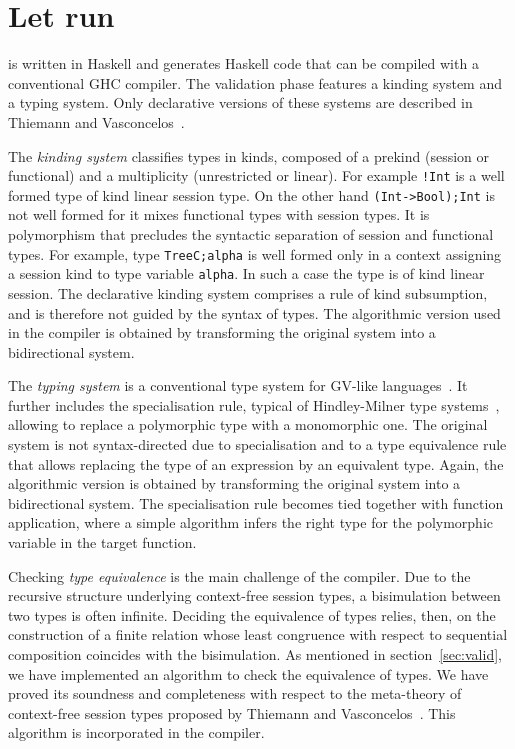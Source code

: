 \section{Let \freest{} run}
\label{sec:compiler}

\freest{} is written in Haskell and generates Haskell code that can be
compiled with a conventional GHC compiler.
%
The validation phase features a kinding system and a typing
system. Only declarative versions of these systems are described in
Thiemann and Vasconcelos~\cite{DBLP:conf/icfp/ThiemannV16}.

The \emph{kinding system} classifies types in kinds, composed of a
prekind (session or functional) and a multiplicity (unrestricted or
linear). For example \lstinline|!Int| is a well formed type of kind
linear session type. On the other hand \lstinline|(Int->Bool);Int| is
not well formed for it mixes functional types with session types.
%
It is polymorphism that precludes the syntactic separation of session
and functional types. For example, type \lstinline|TreeC;alpha| is
well formed only in a context assigning a session kind to type
variable \lstinline|alpha|. In such a case the type is of kind linear
session.
%
The declarative kinding system comprises a rule of kind subsumption,
and is therefore not guided by the syntax of types. The algorithmic
version used in the compiler is obtained by transforming the original
system into a bidirectional system.

The \emph{typing system} is a conventional type system for GV-like
languages~\cite{DBLP:journals/jfp/GayV10}. It further includes the
specialisation rule, typical of Hindley-Milner type
systems~\cite{DBLP:journals/jcss/Milner78}, allowing to replace a
polymorphic type with a monomorphic one. The original system is not
syntax-directed due to specialisation and to a type equivalence rule
that allows replacing the type of an expression by an equivalent
type.
%
Again, the algorithmic version is obtained by transforming the
original system into a bidirectional system. The specialisation rule
becomes tied together with function application, where a simple
algorithm infers the right type for the polymorphic variable in the
target function.

Checking \emph{type equivalence} is the main challenge of the
compiler. Due to the recursive structure underlying context-free 
session types, a bisimulation between two types is often infinite. 
Deciding the equivalence of types relies, then, on the construction 
of a finite relation whose least congruence with respect to  
sequential composition coincides with the bisimulation. As mentioned
in section~\ref{sec:valid}, we have implemented an algorithm 
to check the equivalence of types. We have proved its soundness 
and completeness with respect to the meta-theory
of context-free session types proposed by Thiemann and 
Vasconcelos~\cite{DBLP:conf/icfp/ThiemannV16}. This algorithm
is incorporated in the compiler.

